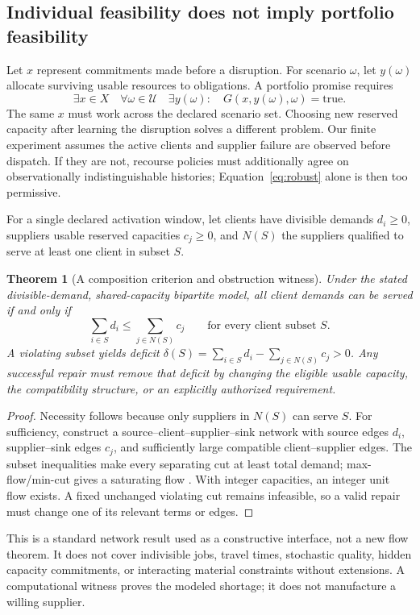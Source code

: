 \documentclass[11pt,a4paper]{article}
\newtheorem{theorem}[definition]{Theorem}
\begin{document}
\subsection{Individual feasibility does not imply portfolio feasibility}
Let $x$ represent commitments made before a disruption. For scenario $\omega$, let $y(\omega)$ allocate surviving usable resources to obligations. A portfolio promise requires
\begin{equation}
\exists x\in X\quad\forall\omega\in\mathcal U\quad\exists y(\omega):\quad G(x,y(\omega),\omega)=\mathrm{true}.\label{eq:robust}
\end{equation}
The same $x$ must work across the declared scenario set. Choosing new reserved capacity after learning the disruption solves a different problem. Our finite experiment assumes the active clients and supplier failure are observed before dispatch. If they are not, recourse policies must additionally agree on observationally indistinguishable histories; Equation~\eqref{eq:robust} alone is then too permissive.

For a single declared activation window, let clients have divisible demands $d_i\ge0$, suppliers usable reserved capacities $c_j\ge0$, and $N(S)$ the suppliers qualified to serve at least one client in subset $S$.
\begin{theorem}[A composition criterion and obstruction witness]\label{thm:cut}
Under the stated divisible-demand, shared-capacity bipartite model, all client demands can be served if and only if
\begin{equation}
\sum_{i\in S}d_i\le\sum_{j\in N(S)}c_j\qquad\text{for every client subset }S.\label{eq:cut}
\end{equation}
A violating subset yields deficit $\delta(S)=\sum_{i\in S}d_i-\sum_{j\in N(S)}c_j>0$. Any successful repair must remove that deficit by changing the eligible usable capacity, the compatibility structure, or an explicitly authorized requirement.
\end{theorem}
\begin{proof}
Necessity follows because only suppliers in $N(S)$ can serve $S$. For sufficiency, construct a source--client--supplier--sink network with source edges $d_i$, supplier--sink edges $c_j$, and sufficiently large compatible client--supplier edges. The subset inequalities make every separating cut at least total demand; max-flow/min-cut gives a saturating flow \cite{ford}. With integer capacities, an integer unit flow exists. A fixed unchanged violating cut remains infeasible, so a valid repair must change one of its relevant terms or edges.
\end{proof}
This is a standard network result used as a constructive interface, not a new flow theorem. It does not cover indivisible jobs, travel times, stochastic quality, hidden capacity commitments, or interacting material constraints without extensions. A computational witness proves the modeled shortage; it does not manufacture a willing supplier.
\end{document}
